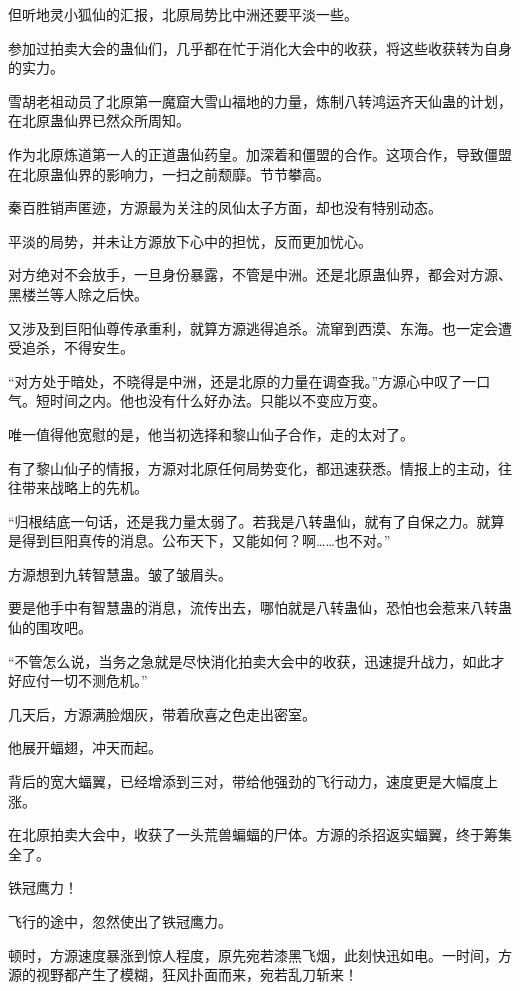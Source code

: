 \begin{this_body}
但听地灵小狐仙的汇报，北原局势比中洲还要平淡一些。

参加过拍卖大会的蛊仙们，几乎都在忙于消化大会中的收获，将这些收获转为自身的实力。

雪胡老祖动员了北原第一魔窟大雪山福地的力量，炼制八转鸿运齐天仙蛊的计划，在北原蛊仙界已然众所周知。

作为北原炼道第一人的正道蛊仙药皇。加深着和僵盟的合作。这项合作，导致僵盟在北原蛊仙界的影响力，一扫之前颓靡。节节攀高。

秦百胜销声匿迹，方源最为关注的凤仙太子方面，却也没有特别动态。

平淡的局势，并未让方源放下心中的担忧，反而更加忧心。

对方绝对不会放手，一旦身份暴露，不管是中洲。还是北原蛊仙界，都会对方源、黑楼兰等人除之后快。

又涉及到巨阳仙尊传承重利，就算方源逃得追杀。流窜到西漠、东海。也一定会遭受追杀，不得安生。

“对方处于暗处，不晓得是中洲，还是北原的力量在调查我。”方源心中叹了一口气。短时间之内。他也没有什么好办法。只能以不变应万变。

唯一值得他宽慰的是，他当初选择和黎山仙子合作，走的太对了。

有了黎山仙子的情报，方源对北原任何局势变化，都迅速获悉。情报上的主动，往往带来战略上的先机。

“归根结底一句话，还是我力量太弱了。若我是八转蛊仙，就有了自保之力。就算是得到巨阳真传的消息。公布天下，又能如何？啊……也不对。”

方源想到九转智慧蛊。皱了皱眉头。

要是他手中有智慧蛊的消息，流传出去，哪怕就是八转蛊仙，恐怕也会惹来八转蛊仙的围攻吧。

“不管怎么说，当务之急就是尽快消化拍卖大会中的收获，迅速提升战力，如此才好应付一切不测危机。”

几天后，方源满脸烟灰，带着欣喜之色走出密室。

他展开蝠翅，冲天而起。

背后的宽大蝠翼，已经增添到三对，带给他强劲的飞行动力，速度更是大幅度上涨。

在北原拍卖大会中，收获了一头荒兽蝙蝠的尸体。方源的杀招返实蝠翼，终于筹集全了。

铁冠鹰力！

飞行的途中，忽然使出了铁冠鹰力。

顿时，方源速度暴涨到惊人程度，原先宛若漆黑飞烟，此刻快迅如电。一时间，方源的视野都产生了模糊，狂风扑面而来，宛若乱刀斩来！


\end{this_body}
